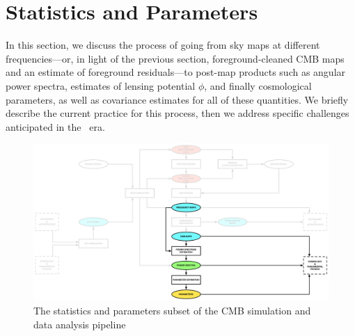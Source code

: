 \section{Statistics and Parameters}

In this section, we discuss the process of going from sky maps at different frequencies---or, in light
of the previous section, foreground-cleaned CMB maps and an estimate of foreground residuals---to
post-map products such as angular power spectra, estimates of lensing potential $\phi$, and finally
cosmological parameters, as well as covariance estimates for all of these quantities. We briefly describe
the current practice for this process, then we address specific challenges anticipated in the \cmbexp\ era.
%
%
%
%
%
%
%
%

\begin{figure}[htbp]
\centering
\includegraphics[width=1\textwidth]{Analysis/sp}
\caption{The statistics and parameters subset of the CMB simulation and data analysis pipeline}
\label{fig_sp}
\end{figure}


